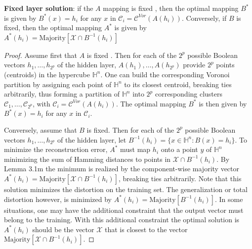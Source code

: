 \begin{theorem}
    \textbf{Fixed layer solution}: if the $A$ mapping is fixed , then the optimal mapping $B^*$ is given by $B^*(x) = h_i$ for any $x$ in $\mathcal{C}_i = \mathcal{C}^{Vor}(A(h_i))$. Conversely, if $B$ is fixed, then the optimal mapping $A^*$ is given by $A^*(h_i) = \text{Majority}\left[\mathcal{X} \cap B^{-1}(h_i)\right]$ 
\end{theorem}
\begin{proof}
    Assume first that $A$ is fixed . Then for each of the $2^p$ possible Boolean vectors $h_1, \dots, h_{2^{p}}$ of the hidden layer, $A(h_1), \dots, A(h_{2^p})$ provide $2^p$ points (centroids) in the hypercube $\mathbb{H}^n$. One can build the corresponding Voronoi partition by assigning each point of $\mathbb{H}^n$ to its closest centroid, breaking ties arbitrarily, thus forming a partition of $\mathbb{H}^n$ into $2^p$ corresponding clusters $\mathcal{C}_1, \dots, \mathcal{C}_{2^p}$, with $\mathcal{C}_i = \mathcal{C}^{Vor}(A(h_i))$. The optimal mapping $B^*$ is then given by $B^*(x) = h_i$ for any $x$ in $\mathcal{C}_i$.

    Conversely, assume that $B$ is fixed. Then for each of the $2^p$ possible Boolean vectors $h_1, \dots, h_{2^{p}}$ of the hidden layer, let $B^{-1}(h_i) = \{x \in \mathbb{H}^n : B(x) = h_i\}$. To minimize the reconstruction error, $A^*$ must map $h_i$ onto a point $y$ of $\mathbb{H}^n$ minimizing the sum of Hamming distances to points in $\mathcal{X} \cap B^{-1}(h_i)$. By Lemma 3.1m the minimum is realized by the component-wise majority vector $A^*(h_i) = \text{Majority}[\mathcal{X} \cap B^{-1}(h_i)]$, breaking ties arbitrarily. Note that this solution minimizes the distortion on the training set. The generalization or total distortion however, is minimized by $A^*(h_i) = \text{Majority}[B^{-1}(h_i)]$. In some situations, one may have the additional constraint that the output vector must belong to the training. With this additional constraint the optimal solution is $A^*(h_i)$ should be the vector $\mathcal{X}$ that is closest to the vector $\text{Majority}[\mathcal{X} \cap B^{-1}(h_i)]$. 
\end{proof}


